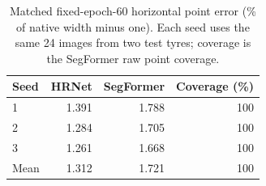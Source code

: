 \begin{table}[t]
\caption{Matched fixed-epoch-60 horizontal point error (\% of native width minus one). Each seed uses the same 24 images from two test tyres; coverage is the SegFormer raw point coverage.}
\label{tab:geometry}
\centering
\small
\setlength{\tabcolsep}{4pt}
\begin{tabular}{lrrr}
\toprule
Seed & HRNet & SegFormer & Coverage (\%) \\
\midrule
1 & 1.391 & 1.788 & 100 \\
2 & 1.284 & 1.705 & 100 \\
3 & 1.261 & 1.668 & 100 \\
Mean & 1.312 & 1.721 & 100 \\
\bottomrule
\end{tabular}
\end{table}
